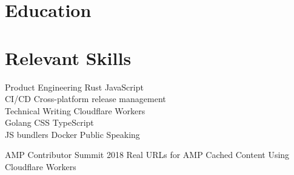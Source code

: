 \documentclass[]{deedy-resume-openfont}
\begin{document}
\section{Education}
\sectionsep

\section{Relevant Skills}
\begin{minipage}[t]{.5\textwidth}
\descript{}
Product Engineering \textbullet{} Rust \textbullet{} JavaScript \\ CI/CD \textbullet{} Cross-platform release management \\ Technical Writing \textbullet{} Cloudflare Workers\\
\sectionsep
{}\descript{}
Golang \textbullet{} CSS \textbullet{} TypeScript \\ JS bundlers \textbullet{} Docker \textbullet{} Public Speaking
\sectionsep
\end{minipage}
\hfill
\begin{minipage}[t]{.49\textwidth}
\descript{}
AMP Contributor Summit 2018 
\sectionsep
{}\descript{}
Real URLs for AMP Cached Content Using Cloudflare Workers 
\sectionsep
\end{minipage}
\end{document}
